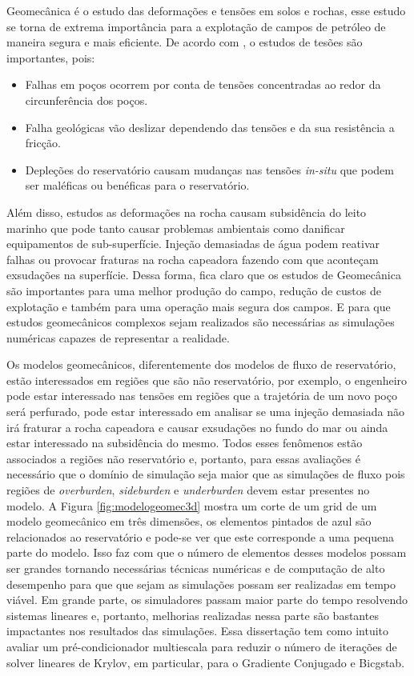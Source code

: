 

Geomecânica é o estudo das deformações e tensões em solos e rochas, esse estudo se torna de extrema importância para a explotação de campos de petróleo de maneira segura e mais eficiente. De acordo com \citet{ResGeomec}, o estudos de tesões são importantes, pois:

\begin{itemize}
    \item Falhas em poços ocorrem por conta de tensões concentradas ao redor da circunferência dos poços.
    \item Falha geológicas vão deslizar dependendo das tensões e da sua resistência a fricção. 
    \item Depleções do reservatório causam mudanças nas tensões \textit{in-situ} que podem ser maléficas ou benéficas para o reservatório.
\end{itemize}

Além disso, estudos as deformações na rocha causam subsidência do leito marinho que pode tanto causar problemas ambientais como danificar equipamentos de sub-superfície. Injeção demasiadas de água  podem reativar falhas ou provocar fraturas na rocha capeadora fazendo com que aconteçam exsudações na superfície. Dessa forma, fica claro que os estudos de Geomecânica são importantes para uma melhor produção do campo, redução de custos de explotação e também para uma operação mais segura dos campos. E para que estudos geomecânicos complexos sejam realizados são necessárias as simulações numéricas capazes de representar a realidade.

Os modelos geomecânicos, diferentemente dos modelos de fluxo de reservatório, estão interessados em regiões que são não reservatório, por exemplo, o engenheiro pode estar interessado nas tensões em regiões que a trajetória de um novo poço será perfurado, pode estar interessado em analisar se uma injeção demasiada não irá fraturar a rocha capeadora e causar exsudações no fundo do mar ou ainda estar interessado na subsidência do mesmo. Todos esses fenômenos estão associados a regiões não reservatório e, portanto, para essas avaliações é necessário que o domínio de simulação seja maior que as simulações de fluxo pois regiões de \textit{overburden}, \textit{sideburden} e \textit{underburden} devem estar presentes no modelo. A Figura \ref{fig:modelogeomec3d} mostra um corte de um grid de um modelo geomecânico em três dimensões, os elementos pintados de azul são relacionados ao reservatório e pode-se ver que este corresponde a uma pequena parte do modelo. Isso faz com que o número de elementos desses modelos possam ser  grandes tornando necessárias técnicas numéricas e de computação de alto desempenho para que que sejam as simulações possam ser realizadas em tempo viável. Em grande parte, os simuladores passam maior parte do tempo resolvendo sistemas lineares e, portanto, melhorias realizadas nessa parte são bastantes impactantes nos resultados das simulações. Essa dissertação tem como intuito avaliar um pré-condicionador multiescala para reduzir o número de iterações de solver lineares de Krylov, em particular, para o Gradiente Conjugado e Bicgstab. 


